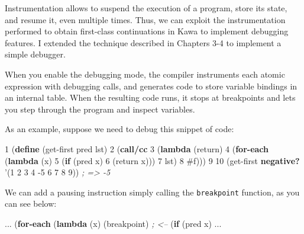 \documentclass[12pt,a4paper,oneside,openright]{book}
\newenvironment{Shaded}{\begin{snugshade}}{\end{snugshade}}
\newcommand{\KeywordTok}[1]{\textcolor[rgb]{0.13,0.29,0.53}{\textbf{{#1}}}}
\newcommand{\DecValTok}[1]{\textcolor[rgb]{0.00,0.00,0.81}{{#1}}}
\newcommand{\CommentTok}[1]{\textcolor[rgb]{0.56,0.35,0.01}{\textit{{#1}}}}
\newcommand{\FunctionTok}[1]{\textcolor[rgb]{0.00,0.00,0.00}{{#1}}}
\newcommand{\NormalTok}[1]{{#1}}
\begin{document}
Instrumentation allows to suspend the execution of a program, store its
state, and resume it, even multiple times. Thus, we can exploit the
instrumentation performed to obtain first-class continuations in Kawa to
implement debugging features. I extended the technique described in
Chapters 3-4 to implement a simple debugger.

When you enable the debugging mode, the compiler instruments each atomic
expression with debugging calls, and generates code to store variable
bindings in an internal table. When the resulting code runs, it stops at
breakpoints and lets you step through the program and inspect variables.

As an example, suppose we need to debug this snippet of code:

\begin{Shaded}
\begin{Highlighting}[]
    \DecValTok{1} \NormalTok{(}\KeywordTok{define}\FunctionTok{ }\NormalTok{(get-first pred lst)}
    \DecValTok{2}   \NormalTok{(}\KeywordTok{call/cc}
    \DecValTok{3}     \NormalTok{(}\KeywordTok{lambda} \NormalTok{(return)}
    \DecValTok{4}       \NormalTok{(}\KeywordTok{for-each} \NormalTok{(}\KeywordTok{lambda} \NormalTok{(x)}
    \DecValTok{5}                   \NormalTok{(}\KeywordTok{if} \NormalTok{(pred x)}
    \DecValTok{6}                     \NormalTok{(return x)))}
    \DecValTok{7}                     \NormalTok{lst)}
    \DecValTok{8}     \DecValTok{#f}\NormalTok{)))}
    \DecValTok{9}
   \DecValTok{10} \NormalTok{(get-first }\KeywordTok{negative?} \NormalTok{'(}\DecValTok{1} \DecValTok{2} \DecValTok{3} \DecValTok{4} \NormalTok{-}\DecValTok{5} \DecValTok{6} \DecValTok{7} \DecValTok{8} \DecValTok{9}\NormalTok{)) }\CommentTok{; => -5}
\end{Highlighting}
\end{Shaded}

We can add a pausing instruction simply calling the \texttt{breakpoint}
function, as you can see below:

\begin{Shaded}
\begin{Highlighting}[]
    \NormalTok{...}
        \NormalTok{(}\KeywordTok{for-each} \NormalTok{(}\KeywordTok{lambda} \NormalTok{(x)}
                     \NormalTok{(breakpoint) }\CommentTok{; <--}
                     \NormalTok{(}\KeywordTok{if} \NormalTok{(pred x)}
    \NormalTok{...}
\end{Highlighting}
\end{Shaded}
\end{document}
